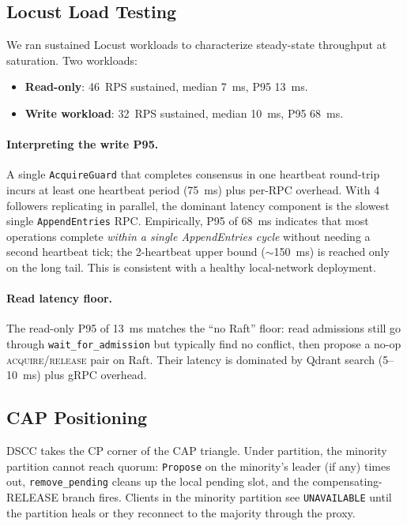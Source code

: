 \documentclass[sigconf]{acmart}
\begin{document}
\subsection{Locust Load Testing}
\label{sec:eval-locust}

We ran sustained Locust workloads to characterize steady-state
throughput at saturation. Two workloads:

\begin{itemize}
\item \textbf{Read-only}: 46~RPS sustained, median 7~ms, P95 13~ms.
\item \textbf{Write workload}: 32~RPS sustained, median 10~ms, P95
  68~ms.
\end{itemize}

\paragraph{Interpreting the write P95.}
A single \texttt{AcquireGuard} that completes consensus in one
heartbeat round-trip incurs at least one heartbeat period
(75~ms) plus per-RPC overhead. With 4 followers replicating in
parallel, the dominant latency component is the slowest single
\texttt{AppendEntries} RPC. Empirically, P95 of 68~ms indicates that
most operations complete \emph{within a single AppendEntries cycle}
without needing a second heartbeat tick; the 2-heartbeat upper bound
($\sim$150~ms) is reached only on the long tail. This is consistent
with a healthy local-network deployment.

\paragraph{Read latency floor.}
The read-only P95 of 13~ms matches the ``no Raft'' floor: read
admissions still go through \texttt{wait\_for\_admission} but
typically find no conflict, then propose a no-op
\textsc{acquire}/\textsc{release} pair on Raft. Their latency is
dominated by Qdrant search (5--10~ms) plus gRPC overhead.

\subsection{CAP Positioning}
\label{sec:eval-cap}

DSCC takes the CP corner of the CAP triangle. Under partition, the
minority partition cannot reach quorum: \texttt{Propose} on the
minority's leader (if any) times out, \texttt{remove\_pending} cleans
up the local pending slot, and the compensating-RELEASE branch fires.
Clients in the minority partition see \texttt{UNAVAILABLE} until the
partition heals or they reconnect to the majority through the proxy.
\end{document}

